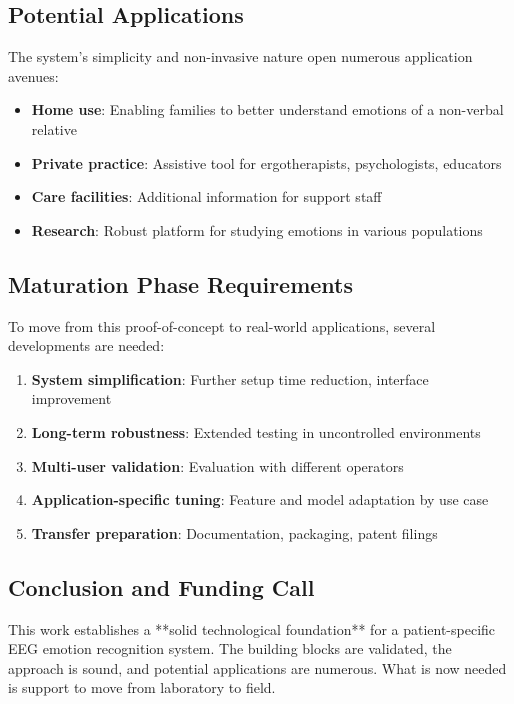 \subsection{Potential Applications}

The system's simplicity and non-invasive nature open numerous application avenues:

\begin{itemize}
    \item \textbf{Home use}: Enabling families to better understand emotions of a non-verbal relative
    \item \textbf{Private practice}: Assistive tool for ergotherapists, psychologists, educators
    \item \textbf{Care facilities}: Additional information for support staff
    \item \textbf{Research}: Robust platform for studying emotions in various populations
\end{itemize}

\subsection{Maturation Phase Requirements}

To move from this proof-of-concept to real-world applications, several developments are needed:

\begin{enumerate}
    \item \textbf{System simplification}: Further setup time reduction, interface improvement
    \item \textbf{Long-term robustness}: Extended testing in uncontrolled environments
    \item \textbf{Multi-user validation}: Evaluation with different operators
    \item \textbf{Application-specific tuning}: Feature and model adaptation by use case
    \item \textbf{Transfer preparation}: Documentation, packaging, patent filings
\end{enumerate}

\subsection{Conclusion and Funding Call}

This work establishes a **solid technological foundation** for a patient-specific EEG emotion recognition system. The building blocks are validated, the approach is sound, and potential applications are numerous. What is now needed is support to move from laboratory to field.

